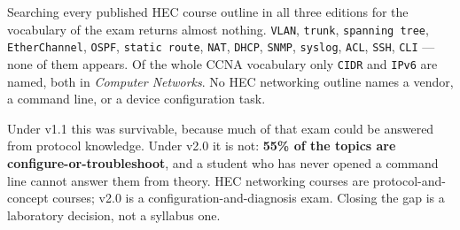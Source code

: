 \documentclass[11pt,a4paper,oneside]{report}
\begin{document}
\begin{warnbox}
Searching every published HEC course outline in all three editions for the
vocabulary of the exam returns almost nothing. \texttt{VLAN}, \texttt{trunk},
\texttt{spanning tree}, \texttt{EtherChannel}, \texttt{OSPF}, \texttt{static
route}, \texttt{NAT}, \texttt{DHCP}, \texttt{SNMP}, \texttt{syslog},
\texttt{ACL}, \texttt{SSH}, \texttt{CLI} --- none of them appears. Of the whole
CCNA vocabulary only \texttt{CIDR} and \texttt{IPv6} are named, both in
\emph{Computer Networks}. No HEC networking outline names a vendor, a command
line, or a device configuration task.

Under v1.1 this was survivable, because much of that exam could be answered from
protocol knowledge. Under v2.0 it is not: \textbf{55\% of the topics are
configure-or-troubleshoot}, and a student who has never opened a command line
cannot answer them from theory. HEC networking courses are protocol-and-concept
courses; v2.0 is a configuration-and-diagnosis exam. Closing the gap is a
laboratory decision, not a syllabus one.
\end{warnbox}
\end{document}
